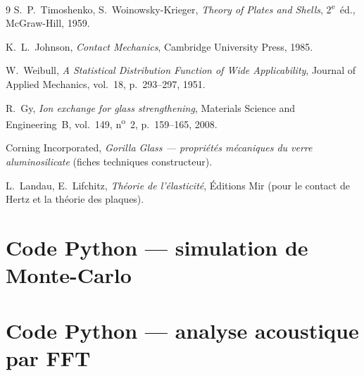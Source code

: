\documentclass[11pt,a4paper]{article}
\begin{document}
\begin{thebibliography}{9}
 S.~P.~Timoshenko, S.~Woinowsky-Krieger,
\textit{Theory of Plates and Shells}, 2\textsuperscript{e}~éd.,
McGraw-Hill, 1959.

 K.~L.~Johnson, \textit{Contact Mechanics},
Cambridge University Press, 1985.

 W.~Weibull, \textit{A Statistical Distribution Function of
Wide Applicability}, Journal of Applied Mechanics, vol.~18, p.~293--297, 1951.

 R.~Gy, \textit{Ion exchange for glass strengthening},
Materials Science and Engineering~B, vol.~149, n\textsuperscript{o}~2,
p.~159--165, 2008.

 Corning Incorporated, \textit{Gorilla Glass --- propriétés
mécaniques du verre aluminosilicate} (fiches techniques constructeur).

 L.~Landau, E.~Lifchitz, \textit{Théorie de l'élasticité},
Éditions Mir (pour le contact de Hertz et la théorie des plaques).
\end{thebibliography}

\appendix
\section{Code Python --- simulation de Monte-Carlo}


\section{Code Python --- analyse acoustique par FFT}

\end{document}
